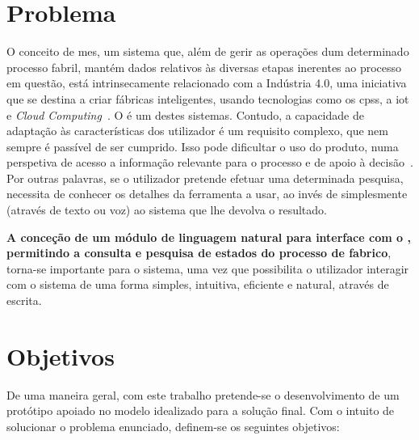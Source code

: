 \section{Problema}
\label{sec:chap01_problem}
O conceito de \gls{mes}, um sistema que, além de gerir as operações dum determinado processo fabril, mantém dados relativos às diversas etapas inerentes ao processo em questão, está intrinsecamente relacionado com a Indústria 4.0, uma iniciativa que se destina a criar fábricas inteligentes, usando tecnologias como os \glspl{cps}, a \gls{iot} e \textit{Cloud Computing}~\parencite{intelligent_manufacturing_context_industry40_review}. O {\productname} é um destes sistemas. Contudo, a capacidade de adaptação às características dos utilizador é um requisito complexo, que nem sempre é passível de ser cumprido. Isso pode dificultar o uso do produto, numa perspetiva de acesso a informação relevante para o processo e de apoio à decisão~\parencite{intelligent_manufacturing_context_industry40_review}. Por outras palavras, se o utilizador pretende efetuar uma determinada pesquisa, necessita de conhecer os detalhes da ferramenta a usar, ao invés de simplesmente  (através de texto ou voz) ao sistema que lhe devolva o resultado.

\textbf{A conceção de um módulo de linguagem natural para interface com o {\productname}, permitindo a consulta e pesquisa de estados do processo de fabrico}, torna-se importante para o sistema, uma vez que possibilita o utilizador interagir com o sistema de uma forma simples, intuitiva, eficiente e natural, através de escrita.

\section{Objetivos}
\label{sec:chap01_objectives}
De uma maneira geral, com este trabalho pretende-se o desenvolvimento de um protótipo apoiado no modelo idealizado para a solução final. Com o intuito de solucionar o problema enunciado, definem-se os seguintes objetivos:

